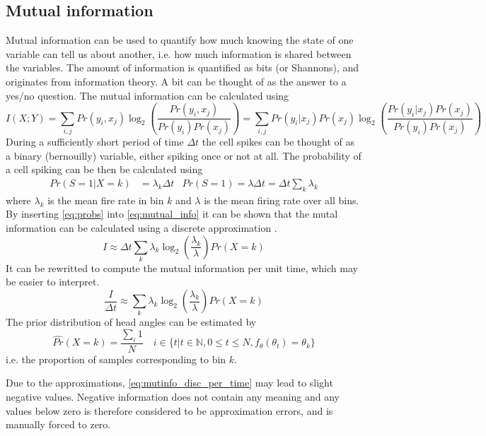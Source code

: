 \subsection{Mutual information}
Mutual information can be used to quantify how much knowing the state of one variable can tell us about another, i.e. how much information is shared between the variables.
The amount of information is quantified as bits (or Shannons), and originates from information theory. A bit can be thought of as the answer to a yes/no question. 
The mutual information can be calculated using 
\begin{equation}\label{eq:mutual_info}
    I(X;Y) = \sum_{i, j} Pr(y_i,x_j) \log_2(\frac{Pr(y_i, x_j)}{Pr(y_i)Pr(x_j)}) = \sum_{i,j}Pr(y_i|x_j)Pr(x_j) \log_2(\frac{Pr(y_i | x_j)Pr(x_j)}{Pr(y_i)Pr(x_j)})
\end{equation}
During a sufficiently short period of time $\Delta t$ the cell spikes can be thought of as a binary (bernouilly) variable, either spiking once or not at all. \cite{mutualinfo} The probability of a cell spiking can be then be calculated using
\begin{align} \label{eq:probs}
    Pr(S=1 | X = k) &= \lambda_k \Delta t & Pr(S=1) = \lambda \Delta t = \Delta t \sum_k \lambda_k
\end{align}
where $\lambda_k$ is the mean fire rate in bin $k$ and $\lambda$ is the mean firing rate over all bins.
By inserting \cref{eq:probs} into \cref{eq:mutual_info} it can be shown that the mutal information can be calculated using a discrete approximation \cite{mutualinfo}.
\begin{equation} \label{eq:mutinfo_disc}
    I \approx \Delta t \sum_k \lambda_k \log_2(\frac{\lambda_k}{\lambda})Pr(X = k)
\end{equation}
It can be rewritted to compute the mutual information per unit time, which may be easier to interpret.
\begin{equation} \label{eq:mutinfo_disc_per_time}
    \frac{I}{\Delta t} \approx \sum_k \lambda_k \log_2(\frac{\lambda_k}{\lambda})Pr(X = k)
\end{equation}
The prior distribution of head angles can be estimated by
\begin{equation}
    \hat{Pr}(X = k) = \frac{\sum_i 1}{N}  \quad i \in \{t | t \in \mathbb{N}, 0 \leq t \leq N, f_\theta(\theta_t) = \theta_k\}
\end{equation}
i.e. the proportion of samples corresponding to bin $k$.

Due to the approximations, \cref{eq:mutinfo_disc_per_time} may lead to slight negative values. Negative information does not contain any meaning and any values below zero is therefore considered to be approximation errors, and is manually forced to zero.

